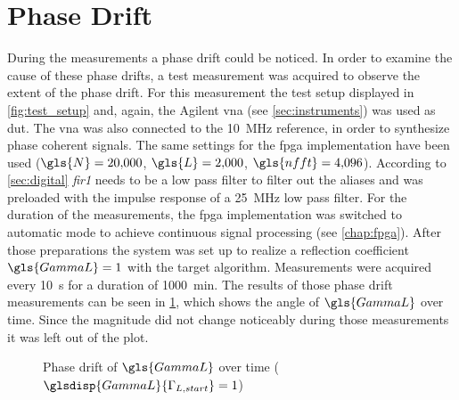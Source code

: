 \documentclass[12pt,a4paper,parskip=full,abstract=true,BCOR=12mm]{scrreprt}
\def\device#1{\mbox{\textit{#1}}}
\begin{document}

\section{Phase Drift}
\label{sec:drift}

During the measurements a phase drift could be noticed. In order to examine the
cause of these phase drifts, a test measurement was acquired
to observe the extent of the phase drift. For this measurement the test setup
displayed in \cref{fig:test_setup} and, again, the Agilent \gls{vna} (see \cref{sec:instruments})
was used as \gls{dut}. The \gls{vna} was also connected to the
\SI{10}{\mega\hertz} reference, in order to synthesize phase coherent signals. The same
settings for the \gls{fpga} implementation have been used ($\gls{N} = \num{20000}$, $\gls{L} = \num{2000}$, $\gls{nfft} = \num{4096}$).
According to \cref{sec:digital} \device{fir1} needs to be a low pass filter to
filter out the aliases and was preloaded with the impulse response of a \SI{25}{\mega\hertz} low pass filter.
For the duration of the measurements, the \gls{fpga} implementation was switched to automatic mode to
achieve continuous signal processing (see \cref{chap:fpga}). After
those preparations the system was set up to realize a reflection coefficient $\gls{GammaL} = 1$ with
the target algorithm. Measurements were acquired every \SI{10}{\second} for a duration
of \SI{1000}{\minute}. The results of those phase drift measurements can be seen in
\cref{fig:phase_single}, which shows the angle of $\gls{GammaL}$ over time. Since the magnitude did not change noticeably during those measurements
it was left out of the plot.

\begin{figure}[htb]
    \centering
    \caption{Phase drift of $\gls{GammaL}$ over time ($\glsdisp{GammaL}{\Gamma_{L,start}} = 1$)}
    \label{fig:phase_single}
\end{figure}
\end{document}
